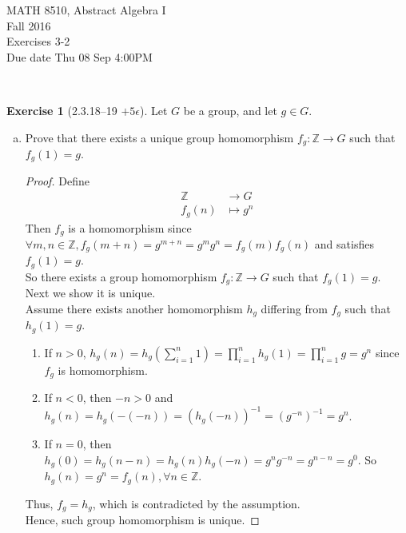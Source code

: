 \documentclass{amsart}
\newcommand{\bbz}{\mathbb{Z}}
\theoremstyle{plain}
\theoremstyle{definition}
\newtheorem{exer}[lem]{Exercise}
\begin{document}
\noindent MATH 8510, Abstract Algebra I \\
Fall 2016\\
Exercises 3-2\\
Due date Thu 08 Sep 4:00PM

\

%
%

\begin{exer}[2.3.18--19 $+5\epsilon$]
Let $G$ be a group, and let $g\in G$.
\begin{enumerate}[(a)]
\item Prove that there exists a unique group homomorphism $f_g\colon\bbz\to G$ such that $f_g(1)=g$. 
	\begin{proof}
		Define
		\begin{align*}
			\bbz & \to G \\
			f_g(n) & \mapsto g^n
		\end{align*}
		Then $f_g$ is a homomorphism since $\forall m,n \in \bbz, f_g(m+n) = g^{m+n} = g^mg^n = f_g(m)f_g(n)$ and satisfies $f_g(1) = g$.\\
		So there exists a group homomorphism $f_g\colon\bbz\to G$ such that $f_g(1)=g$.\\
		Next we show it is unique.\\
		Assume there exists another homomorphism $h_g$ differing from $f_g$ such that $h_g(1) = g$. 
		\begin{enumerate}
			\item If $n > 0$, $h_g(n) = h_g(\sum_{i=1}^n1) = \prod_{i=1}^nh_g(1) = \prod_{i=1}^n g = g^n$ since $f_g$ is homomorphism.
			\item If $n < 0$, then $-n > 0$ and $h_g(n) = h_g(-(-n)) = (h_g(-n))^{-1} = (g^{-n})^{-1} = g^n$.
			\item If $n = 0$, then $h_g(0) = h_g(n-n) = h_g(n)h_g(-n) = g^ng^{-n} = g^{n-n} = g^0$.
				So $h_g(n) = g^n = f_g(n), \forall n \in \bbz$. \\
		\end{enumerate}
		Thus, $f_g = h_g$, which is contradicted by the assumption.\\
		Hence, such group homomorphism is unique.
	\end{proof}
	

\end{enumerate}
\end{exer}
\end{document}
